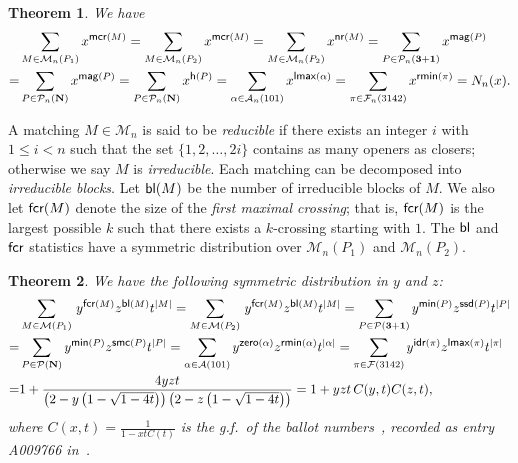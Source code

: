 \documentclass[11pt]{article}
\DeclareMathOperator{\bl}{\mbox{\sf{bl}}}
\DeclareMathOperator{\fcr}{\mbox{\sf{fcr}}}
\newtheorem{thm}{Theorem}[section]
\newcommand{\A}{\mathcal{A}}
\newcommand{\F}{\mathcal{F}}
\newcommand{\M}{\mathcal{M}}
\begin{document}
	\begin{thm}\label{thm-P1-nara}
		We have
		\begin{align}\label{Narayana-sta-P1-P2}
			& \sum_{M \in \M_n(P_1)} x^{\mbox{\sf{\footnotesize mcr}}(M)}= \sum_{M \in \M_n(P_2)} x^{\mbox{\sf{\footnotesize mcr}}(M)} = \sum_{M \in \M_n(P_2)} x^{\mbox{\sf{\footnotesize nr}}(M)} 
			=\sum_{P \in \mathcal{P}_n\mathbf{(3+1)}} x^{\mbox{\sf{\footnotesize mag}}(P)} \notag \\
			= & \sum_{P \in \mathcal{P}_n\mathbf{(N)}} x^{\mbox{\sf{\footnotesize mag}}(P)}  = \sum_{P \in \mathcal{P}_n\mathbf{(N)}} x^{\mbox{\sf{\footnotesize h}}(P)}
			= \sum_{\alpha \in \A_n(101)} x^{\mbox{\sf{\footnotesize lmax}}(\alpha)} = \sum_{\pi \in \F_n(3142)} x^{\mbox{\sf{\footnotesize rmin}}(\pi)} =N_n(x).
		\end{align}
	\end{thm}
	
	A matching $M \in \M_n$ is said to be \textit{reducible} if there exists an integer $i$ with $1\le i<n$ such that the set $\{1,2,\dots,2i\}$ contains as many openers as closers; otherwise we say $M$ is \textit{irreducible}.
	Each matching can be decomposed into \textit{irreducible blocks}.
	Let $\bl(M)$ be the number of irreducible blocks of $M$. We also let $\fcr(M)$ denote the size of the \textit{first maximal crossing}; that is, $\fcr(M)$ is the largest possible $k$ such that there exists a $k$-crossing starting with $1$. The $\bl$ and $\fcr$ statistics have a symmetric distribution over $\M_n(P_1)$ and $\M_n(P_2)$. 
	
	\begin{thm}\label{thm-ballot}
		We have the following symmetric distribution in $y$ and $z$:
		\begin{align}\label{formula-fcr-block-C(x,t)}
			&\sum_{M \in \M(P_1)}\, y^{\mbox{\sf{\footnotesize fcr}}(M)} z^{\mbox{\sf{\footnotesize bl}}(M)} t^{|M|}
			= \sum_{M \in \M(P_2)}\,y^{\mbox{\sf{\footnotesize fcr}}(M)} z^{\mbox{\sf{\footnotesize bl}}(M)}t^{|M|}
			=\sum_{P \in \mathcal{P}{\bf (3+1)}}  y^{\mbox{\sf{\footnotesize min}}(P)} z^{\mbox{\sf{\footnotesize ssd}}(P)} t^{|P|}  \notag\\
			=&\sum_{P \in \mathcal{P}{\bf (N)}}  y^{\mbox{\sf{\footnotesize min}}(P)} z^{\mbox{\sf{\footnotesize smc}}(P)} t^{|P|}  
			=\sum_{\alpha \in \A(101)} y^{\mbox{\sf{\footnotesize zero}}(\alpha)} z^{\mbox{\sf{\footnotesize rmin}}(\alpha)} t^{|\alpha|} 
			=\sum_{\pi \in \F(3142)} y^{\mbox{\sf{\footnotesize idr}}(\pi)} z^{\mbox{\sf{\footnotesize lmax}}(\pi)} t^{|\pi|} \notag \\
			=&  1 + \frac{4  y z t}{\left(2  - y \left(1 - \sqrt{1 - 4 t}\right) \right) \left(2  - z \left(1 - \sqrt{1 - 4 t}\right) \right)}  
			=  1+yzt\,C(y,t) C(z,t),  
		\end{align}
		where $C(x,t) = \frac{1}{1 - x t C(t)}$ is the g.f.\ of the {\it ballot numbers}~{\rm \cite{Barcucci-Verri}}, recorded as entry {\rm A009766} in~{\rm \cite{OEIS}}.
	\end{thm}
	
\end{document}
